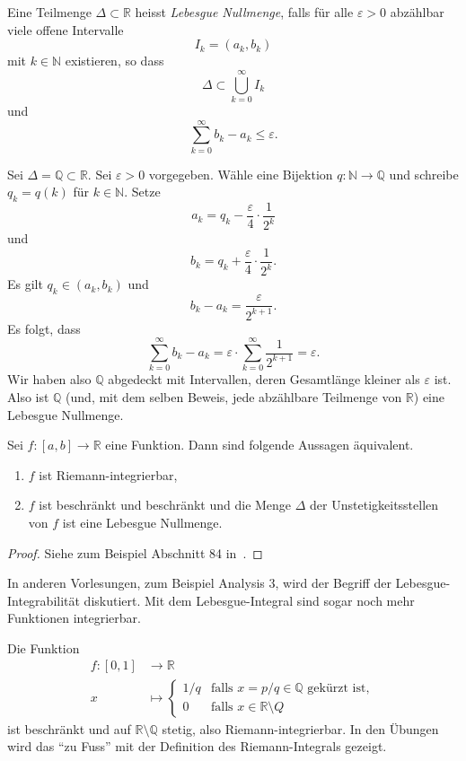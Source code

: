 \documentclass[../main.tex]{subfiles}
\begin{document}
\begin{definition}
  Eine Teilmenge $\Delta \subset \mathbb{R}$ 
  heisst \emph{Lebesgue Nullmenge},
  falls für alle $\varepsilon > 0$ abzählbar viele
  offene Intervalle
  \[
    I_k = (a_k, b_k)
  \]
  mit $k \in \mathbb{N}$
  existieren, so dass 
  \[
    \Delta \subset \bigcup_{k=0}^{\infty} I_k
  \]
  und
  \[
    \sum_{k=0}^{\infty} b_k - a_k \leq \varepsilon.
  \]
\end{definition}

\begin{example}
  Sei $\Delta = \mathbb{Q} \subset \mathbb{R}$.
  Sei $\varepsilon > 0$ vorgegeben.
  Wähle eine Bijektion $q \colon\mathbb{N} \to \mathbb{Q}$ 
  und schreibe $q_k = q(k)$ für $k \in \mathbb{N}$.
  Setze
  \[
    a_k = q_k - \frac{\varepsilon}{4} \cdot \frac{1}{2^k}
  \]
  und
  \[
    b_k = q_k + \frac{\varepsilon}{4} \cdot \frac{1}{2^k}.
  \]
  Es gilt $q_k \in (a_k, b_k)$ und  
  \[
    b_k - a_k = \frac{\varepsilon}{2^{k+1}}.
  \]
  Es folgt, dass
  \[
    \sum_{k=0}^{\infty} b_k - a_k = \varepsilon \cdot
    \sum_{k=0}^{\infty} \frac{1}{2^{k+1}} = \varepsilon.
  \]
  Wir haben also $\mathbb{Q}$ abgedeckt mit Intervallen,
  deren Gesamtlänge kleiner als $\varepsilon$ ist.
  Also ist $\mathbb{Q}$ (und, mit dem selben Beweis,
  jede abzählbare Teilmenge von $\mathbb{R}$)
  eine Lebesgue Nullmenge.
\end{example}

\begin{theorem}[Lebesgue 1901]
  Sei $f \colon [a, b] \to \mathbb{R}$ eine Funktion.
  Dann sind folgende Aussagen äquivalent.
  \begin{enumerate}[\normalfont(i)]
    \item $f$ ist  Riemann-integrierbar,
    \item $f$ ist beschränkt und beschränkt und die Menge
      $\Delta$ der Unstetigkeitsstellen von $f$ ist
      eine Lebesgue Nullmenge.
  \end{enumerate}
\end{theorem}

\begin{proof}
  Siehe zum Beispiel Abschnitt 84 in~\cite{heuser}.
\end{proof}

In anderen Vorlesungen, zum Beispiel Analysis 3, wird
der Begriff der Lebesgue-Integrabilität diskutiert.
Mit dem Lebesgue-Integral sind sogar noch mehr Funktionen
integrierbar.

\begin{example}
  Die Funktion
  \begin{align*}
    f \colon [0, 1] & \to \mathbb{R} \\
    x & \mapsto 
    \begin{cases}
      1/q & \text{falls $x = p/q \in \mathbb{Q}$ gekürzt ist},\\
      0 & \text{falls $x \in \mathbb{R} \setminus Q$}
    \end{cases}
  \end{align*}
  ist beschränkt
  und auf $\mathbb{R} \setminus \mathbb{Q}$ stetig,
  also Riemann-integrierbar. In den Übungen wird das
  ``zu Fuss'' mit der Definition des Riemann-Integrals
  gezeigt.
\end{example}
\end{document}
